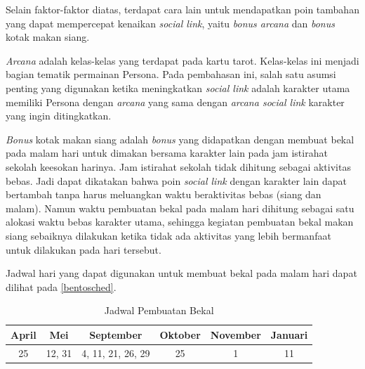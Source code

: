 


Selain faktor-faktor diatas, terdapat cara lain untuk mendapatkan poin tambahan yang dapat mempercepat kenaikan \textit{social link}, yaitu \textit{bonus arcana} dan \textit{bonus} kotak makan siang.

\textit{Arcana} adalah kelas-kelas yang terdapat pada kartu tarot. Kelas-kelas ini menjadi bagian tematik permainan Persona. Pada pembahasan ini, salah satu asumsi penting yang digunakan ketika meningkatkan \textit{social link} adalah karakter utama memiliki Persona dengan \textit{arcana} yang sama dengan \textit{arcana social link} karakter yang ingin ditingkatkan.

\textit{Bonus} kotak makan siang adalah \textit{bonus} yang didapatkan dengan membuat bekal pada malam hari untuk dimakan bersama karakter lain pada jam istirahat sekolah keesokan harinya. Jam istirahat sekolah tidak dihitung sebagai aktivitas bebas. Jadi dapat dikatakan bahwa poin \textit{social link} dengan karakter lain dapat bertambah tanpa harus meluangkan waktu beraktivitas bebas (siang dan malam). Namun waktu pembuatan bekal pada malam hari dihitung sebagai satu alokasi waktu bebas karakter utama, sehingga kegiatan pembuatan bekal makan siang sebaiknya dilakukan ketika tidak ada aktivitas yang lebih bermanfaat untuk dilakukan pada hari tersebut.

Jadwal hari yang dapat digunakan untuk membuat bekal pada malam hari dapat dilihat pada \autoref{bentosched}.
\begin{table}[htb]
    \caption{\label{bentosched}Jadwal Pembuatan Bekal}
    \begin{center}
        \begin{tabular}{ | c | c | c | c | c | c |}
            \hline
            \textbf{April} & \textbf{Mei} & \textbf{September} & \textbf{Oktober} & \textbf{November} & \textbf{Januari} \\
            \hline
            25             & 12, 31       & 4, 11, 21, 26, 29  & 25               & 1                 & 11               \\
            \hline
        \end{tabular}
    \end{center}
\end{table}

